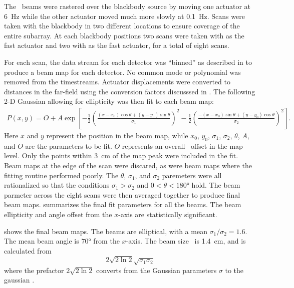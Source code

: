 The \Imager\ beams were rastered over the blackbody source by moving one actuator at \SI{6}{\hertz} while the other actuator moved much more slowly at \SI{0.1}{\hertz}.
Scans were taken with the blackbody in two different locations to ensure coverage of the entire subarray.
At each blackbody positions two scans were taken with  as the fast actuator and two with  as the fast actuator, for a total of eight scans.

For each scan, the data stream for each detector was ``binned'' as described in  to produce a beam map for each detector.
No common mode or polynomial was removed from the timestreams.
Actuator displacements were converted to distances in the far-field using the conversion factors discusssed in .
The following 2-D Gaussian allowing for ellipticity was then fit to each beam map:
\begin{multline}
  P(x,y) = O + A \exp{ \left[  - \frac{1}{2} \left( \frac{ (x-x_0) \cos{\theta} + (y-y_0) \sin{\theta}}{\sigma_1} \right)^2 
                               - \frac{1}{2} \left( \frac{-(x-x_0) \sin{\theta} + (y-y_0) \cos{\theta}}{\sigma_2} \right)^2
                       \right] }.
\end{multline}
Here $x$ and $y$ represent the position in the beam map, while $x_0$, $y_0$, $\sigma_1$, $\sigma_2$, $\theta$, $A$, and $O$ are the parameters to be fit.
$O$ represents an overall \DC\ offset in the map level.
Only the points within \SI{3}{\cm} of the map peak were included in the fit.
Beam maps at the edge of the scan were discared, as were beam maps where the fitting routine performed poorly.
The $\theta$, $\sigma_1$, and $\sigma_2$ paremeters were all rationalized so that the conditions $\sigma_1 > \sigma_2$ and $0 < \theta < \ang{180}$ hold.
The beam parmeter across the eight scans were then averaged together to produce final beam maps.
 summarizes the final fit parameters for all the beams.
The beam ellipticity and angle offset from the $x$-axis are statistically significant.

 shows the final beam maps.
The beams are elliptical, with a mean $\sigma_1 / \sigma_2 = \si{1.6}$.
The mean beam angle is $\ang{70}$ from the $x$-axis.
The beam size \FWHM\ is \SI{1.4}{\cm}, and is calculated from
\begin{equation}
  2 \sqrt{2 \ln{2}} \sqrt{\sigma_1 \sigma_2}
\end{equation}
where the prefactor $2 \sqrt{2 \ln{2}}$ converts from the Gaussian parameters $\sigma$ to the gaussian \FWHM.


